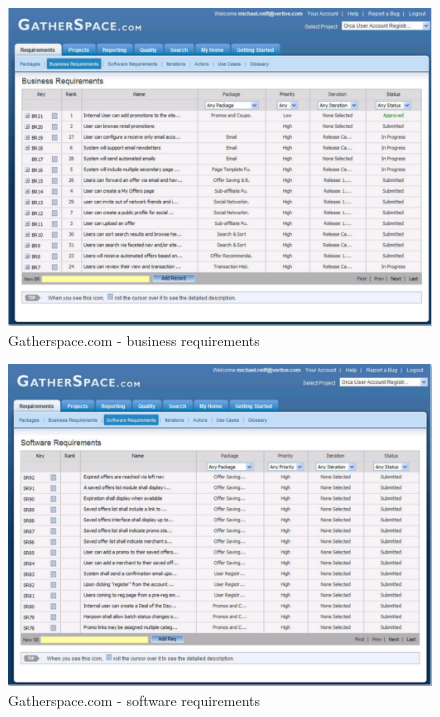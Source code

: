       \begin{figure}[t]
        \centering
        \includegraphics[width=1.0\textwidth]{img/gatherspace_1.pdf}
        \caption{Gatherspace.com - business requirements}
        \label{fig:gatherspace_1}
      \end{figure}

      \begin{figure}[t]
        \centering
        \includegraphics[width=1.0\textwidth]{img/gatherspace_2.pdf}
        \caption{Gatherspace.com - software requirements}
        \label{fig:gatherspace_2}
      \end{figure}

